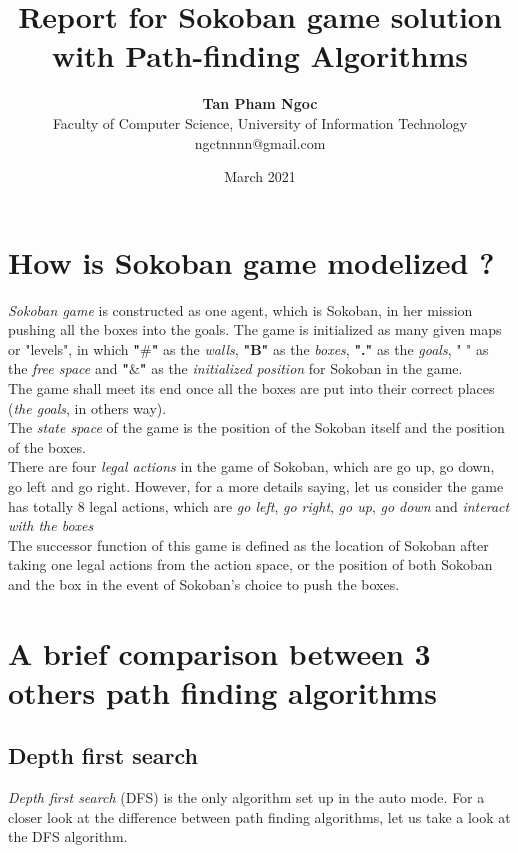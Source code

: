 \documentclass{article}
\title{Report for Sokoban game solution with Path-finding Algorithms}
\author{\textbf{Tan Pham Ngoc}\\
Faculty of Computer Science, University of Information Technology\\
\small ngctnnnn@gmail.com}
\date{March 2021}
\begin{document}
\maketitle

\section{How is Sokoban game modelized ?} 

\textit{Sokoban game} is constructed as one agent, which is Sokoban, in her mission pushing all the boxes into the goals. The game is initialized as many given maps or "levels", in which \textbf{"$\#$"} as the \textit{walls}, \textbf{"B"} as the \textit{boxes}, \textbf{"."} as the \textit{goals}, " " as the \textit{free space} and \textbf{"$\&$"} as the \textit{initialized position} for Sokoban in the game.\\

The game shall meet its end once all the boxes are put into their correct places (\textit{the goals}, in others way).\\

The \textit{state space} of the game is the position of the Sokoban itself and the position of the boxes.\\

There are four \textit{legal actions} in the game of Sokoban, which are go up, go down, go left and go right. However, for a more details saying, let us consider the game has totally 8 legal actions, which are \textit{go left}, \textit{go right}, \textit{go up}, \textit{go down} and \textit{interact with the boxes} \\

The successor function of this game is defined as the location of Sokoban after taking one legal actions from the action space, or the position of both Sokoban and the box in the event of Sokoban's choice to push the boxes.

\section{A brief comparison between 3 others path finding algorithms}
\subsection{Depth first search}
\textit{Depth first search} (DFS) is the only algorithm set up in the auto mode. For a closer look at the difference between path finding algorithms, let us take a look at the DFS algorithm.\\
\end{document}
